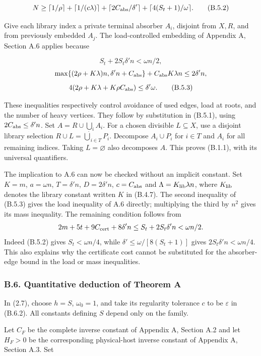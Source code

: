\documentclass[english,11pt,a4paper]{article}
\begin{document}
\[N\ge\lceil1/\rho\rceil+\lceil1/(c\lambda)\rceil
+\lceil2C_{\rm abs}/\delta'\rceil+\lceil4(S_t+1)/\omega\rceil.
\tag{B.5.2}\]

Give each library index a private terminal absorber \(A_i\), disjoint from \(X,R\), and from previously embedded \(A_j\). The load-controlled embedding of Appendix A, Section A.6 applies because

\[S_t+2S_t\delta'n<\omega n/2,\] \[\max\{(2\rho+K\lambda)n,\delta'n+C_{\rm abs}\}+C_{\rm abs}K\lambda n\le2\delta'n,\] \[4(2\rho+K\lambda+K\rho C_{\rm abs})\le\delta'\omega.
\tag{B.5.3}\]

These inequalities respectively control avoidance of used edges, load at roots, and the number of heavy vertices. They follow by substitution in (B.5.1), using \(2C_{\rm abs}\le\delta'n\). Set \(A=R\cup\bigcup_i A_i\). For a chosen divisible \(L\subseteq X\), use a disjoint library selection \(R\cup L=\dot\bigcup_{i\in T}P_i\). Decompose \(A_i\cup P_i\) for \(i\in T\) and \(A_i\) for all remaining indices. Taking \(L=\varnothing\) also decomposes \(A\). This proves (B.1.1), with its universal quantifiers.

The implication to A.6 can now be checked without an implicit constant. Set \(K=m\), \(a=\omega n\), \(T=\delta'n\), \(D=2\delta'n\), \(c=C_{\rm abs}\) and \(\Lambda=K_{\rm lib}\lambda n\), where \(K_{\rm lib}\) denotes the library constant written \(K\) in (B.4.7). The second inequality of (B.5.3) gives the load inequality of A.6 directly; multiplying the third by \(n^2\) gives its mass inequality. The remaining condition follows from \[2m+5t+9C_{\rm cert}+8\delta'n
\le S_t+2S_t\delta'n<\omega n/2.\] Indeed (B.5.2) gives \(S_t<\omega n/4\), while \(\delta'\le\omega/[8(S_t+1)]\) gives \(2S_t\delta'n<\omega n/4\). This also explains why the certificate cost cannot be substituted for the absorber-edge bound in the load or mass inequalities.

\subsubsection{B.6. Quantitative deduction of Theorem A}\label{b.6.-quantitative-deduction-of-theorem-a}

In (2.7), choose \(h=S\), \(\omega_0=1\), and take its regularity tolerance \(c\) to be \(\varepsilon\) in (B.6.2). All constants defining \(S\) depend only on the family.

Let \(C_F\) be the complete inverse constant of Appendix A, Section A.2 and let \(H_F>0\) be the corresponding physical-host inverse constant of Appendix A, Section A.3. Set
\end{document}
